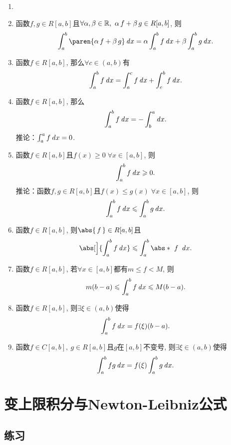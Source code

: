 \begin{theorem*}
  \begin{enumerate}
  \item[]
  \item 函数\(f, g \in R[a,b]\)且\(\forall \alpha, \beta \in \mathbb{R},\ \alpha\,f + \beta\,g \in R[a,b]\), 则
    \[
      \int_a^b \paren{\alpha\,f + \beta\,g} \dx
      = \alpha \int_a^b f \dx + \beta \int_a^b g \dx.
    \]

  \item 函数\(f \in R[a,b]\), 那么\(\forall c \in (a,b)\)有
    \[
      \int_a^b f \mathop{}\!\mathit{d} x = \int_a^c f \mathop{}\!\mathit{d} x + \int_c^b f \mathop{}\!\mathit{d} x.
    \]

  \item 函数\(f \in R[a,b]\), 那么
    \[
      \int_a^b f \mathop{}\!\mathit{d} x = - \int_b^a \mathop{}\!\mathit{d} x.
    \]
    推论：\(\int_a^a f \mathop{}\!\mathit{d} x = 0\).

  \item 函数\(f \in R[a,b]\)且\(f(x) \ge 0\; \forall x \in [a,b]\), 则
    \[
      \int_a^b f \dx \ge 0.
    \]
    推论：函数\(f, g \in R[a,b]\)且\(f(x) \le g(x)\; \forall x \in [a,b]\), 则
    \[
      \int_a^b f \dx \le \int_a^b g \dx.
    \]

  \item 函数\(f \in R[a,b]\), 则\(\abs{\, f\,} \in R[a,b]\)且
    \[
      \abs[\Big]{\int_a^b f \dx} \le \int_a^b \abs*{\mkern6mu f\ } \dx.
    \]

  \item 函数\(f \in R[a,b]\), 若\(\forall x \in [a,b]\)都有\(m \le f < M\), 则
    \[
      m(b-a) \le \int_a^b f \dx \le M(b-a).
    \]

  \item 函数\(f \in R[a,b]\), 则\(\exists \xi \in (a,b)\)使得
    \[
      \int_a^b f \mathop{}\!\mathit{d} x = f(\xi)(b-a).
    \]

  \item 函数\(f \in C[a,b],\ g \in R[a,b]\)且\(g\)在\([a,b]\)不变号, 则\(\exists \xi \in (a,b)\)使得
    \[
      \int_a^b fg \mathop{}\!\mathit{d} x = f(\xi) \int_a^b g \mathop{}\!\mathit{d} x.
    \]
  \end{enumerate}
\end{theorem*}

\section{变上限积分与Newton-Leibniz公式}

\ifshowex
{}
\subsection*{练习}

